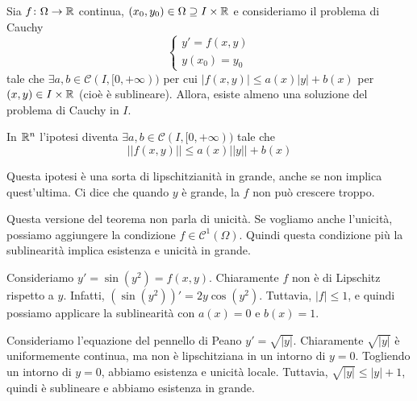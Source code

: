 \documentclass[a4paper]{article}
\begin{document}
\begin{radioactive}
\begin{snippettheorem}{}
    Sia \(f \colon \Omega \to \mathbb{R}\) continua,
    \((x_0, y_0) \in \Omega \supseteq I \times \mathbb{R}\) e consideriamo il problema di Cauchy
    \[
        \begin{cases}
            y' = f(x,y) \\
            y(x_0) = y_0
        \end{cases}
    \]
    tale che \(\exists a,b \in \mathcal C(I,[0,+\infty))\)
    per cui \(|f(x,y)| \leq a(x)|y| + b(x)\)
    per \((x,y) \in I \times \mathbb{R}\) (cioè è sublineare).
    Allora, esiste almeno una soluzione del problema di Cauchy in \(I\).
\end{snippettheorem}
\end{radioactive}

\begin{radioactive}
In \(\mathbb{R}^n\) l'ipotesi diventa
\(\exists a,b \in \mathcal C(I,[0,+\infty))\)
tale che
\[
    ||f(x,y)|| \leq a(x)||y|| + b(x)
\]

Questa ipotesi è una sorta di lipschitzianità in grande, anche se non implica quest'ultima.
Ci dice che quando \(y\) è grande, la \(f\) non può crescere troppo.

Questa versione del teorema non parla di unicità.
Se vogliamo anche l'unicità, possiamo aggiungere la condizione
\(f \in \mathcal C^1(\Omega)\).
Quindi questa condizione più la sublinearità implica esistenza e unicità in grande.
\end{radioactive}

\begin{radioactive}
\begin{snippetexample}{}
    Consideriamo \(y' = \sin(y^2) = f(x,y)\).
    Chiaramente \(f\) non è di Lipschitz rispetto a \(y\).
    Infatti, \((\sin(y^2))' = 2y\cos(y^2)\).
    Tuttavia, \(|f| \leq 1\), e quindi possiamo applicare la sublinearità
    con \(a(x) = 0\) e \(b(x) = 1\).
\end{snippetexample}
\end{radioactive}

\begin{radioactive}
\begin{snippetexample}{}
    Consideriamo l'equazione del pennello di Peano
    \(y' = \sqrt{|y|}\).
    Chiaramente \(\sqrt{|y|}\) è uniformemente continua, ma non è lipschitziana
    in un intorno di \(y=0\).
    Togliendo un intorno di \(y=0\), abbiamo esistenza e unicità locale.
    Tuttavia, \(\sqrt{|y|} \leq |y| + 1\), quindi è sublineare e abbiamo esistenza in grande.
\end{snippetexample}
\end{radioactive}
\end{document}
